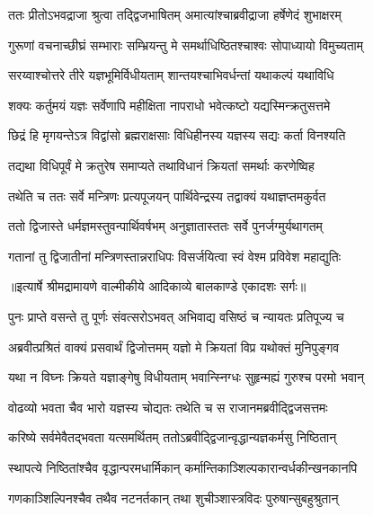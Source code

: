 \twolineshloka
{ततः प्रीतोऽभवद्राजा श्रुत्वा तद्द्विजभाषितम्}
{अमात्यांश्चाब्रवीद्राजा हर्षेणेदं शुभाक्षरम्} %

\twolineshloka
{गुरूणां वचनाच्छीघ्रं सम्भाराः सम्भ्रियन्तु मे}
{समर्थाधिष्ठितश्चाश्वः सोपाध्यायो विमुच्यताम्} %

\twolineshloka
{सरय्वाश्चोत्तरे तीरे यज्ञभूमिर्विधीयताम्}
{शान्तयश्चाभिवर्धन्तां यथाकल्पं यथाविधि} %

\twolineshloka
{शक्यः कर्तुमयं यज्ञः सर्वेणापि महीक्षिता}
{नापराधो भवेत्कष्टो यद्यस्मिन्क्रतुसत्तमे} %

\twolineshloka
{छिद्रं हि मृगयन्तेऽत्र विद्वांसो ब्रह्मराक्षसाः}
{विधिहीनस्य यज्ञस्य सद्यः कर्ता विनश्यति} %

\twolineshloka
{तद्यथा विधिपूर्वं मे क्रतुरेष समाप्यते}
{तथाविधानं क्रियतां समर्थाः करणेष्विह} %

\twolineshloka
{तथेति च ततः सर्वे मन्त्रिणः प्रत्यपूजयन्}
{पार्थिवेन्द्रस्य तद्वाक्यं यथाज्ञप्तमकुर्वत} %

\twolineshloka
{ततो द्विजास्ते धर्मज्ञमस्तुवन्पार्थिवर्षभम्}
{अनुज्ञातास्ततः सर्वे पुनर्जग्मुर्यथागतम्} %

\twolineshloka
{गतानां तु द्विजातीनां मन्त्रिणस्तान्नराधिपः}
{विसर्जयित्वा स्वं वेश्म प्रविवेश महाद्युतिः} %


{॥इत्यार्षे श्रीमद्रामायणे वाल्मीकीये आदिकाव्ये बालकाण्डे एकादशः सर्गः॥}


\twolineshloka
{पुनः प्राप्ते वसन्ते तु पूर्णः संवत्सरोऽभवत्}
{अभिवाद्य वसिष्ठं च न्यायतः प्रतिपूज्य च} %

\twolineshloka
{अब्रवीत्प्रश्रितं वाक्यं प्रसवार्थं द्विजोत्तमम्}
{यज्ञो मे क्रियतां विप्र यथोक्तं मुनिपुङ्गव} %

\twolineshloka
{यथा न विघ्नः क्रियते यज्ञाङ्गेषु विधीयताम्}
{भवान्स्निग्धः सुहृन्मह्यं गुरुश्च परमो भवान्} %

\twolineshloka
{वोढव्यो भवता चैव भारो यज्ञस्य चोद्यतः}
{तथेति च स राजानमब्रवीद्द्विजसत्तमः} %

\twolineshloka
{करिष्ये सर्वमेवैतद्भवता यत्समर्थितम्}
{ततोऽब्रवीद्द्विजान्वृद्धान्यज्ञकर्मसु निष्ठितान्} %

\twolineshloka
{स्थापत्ये निष्ठितांश्चैव वृद्धान्परमधार्मिकान्}
{कर्मान्तिकाञ्शिल्पकारान्वर्धकीन्खनकानपि} %

\twolineshloka
{गणकाञ्शिल्पिनश्चैव तथैव नटनर्तकान्}
{तथा शुचीञ्शास्त्रविदः पुरुषान्सुबहुश्रुतान्} %

